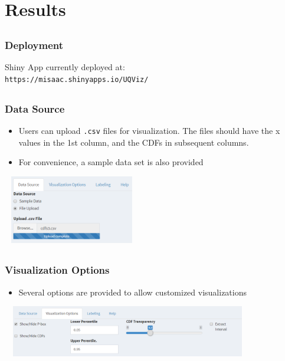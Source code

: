 \documentclass[handout, xcolor=dvipsnames]{beamer}
\begin{document}
\section{Results}  

\subsection{}
\begin{frame}
	\frametitle{Deployment}
	\begin{center} 
		Shiny App currently deployed at: \\ {\tt https://misaac.shinyapps.io/UQViz/}
	\end{center}
\end{frame}

\subsection{}
\begin{frame}
	\frametitle{Data Source}
	\begin{itemize}
	\item Users can upload {\tt .csv} files for visualization. The files should have the x values in the 1st column, and the CDFs in subsequent columns. 
	\item For convenience, a sample data set is also provided
	\end{itemize}
	\begin{center} 
		\includegraphics[height=3cm,width=6cm]{figures/tab_ds.png}
	\end{center}
\end{frame}

\subsection{}
\begin{frame}
	\frametitle{Visualization Options}
	\begin{itemize}
	\item Several options are provided to allow customized visualizations 
	\end{itemize}
	\begin{center} 
		\includegraphics[height=2.25cm,width=11cm]{figures/tab_vo.png}
	\end{center}
\end{frame}
\end{document}
